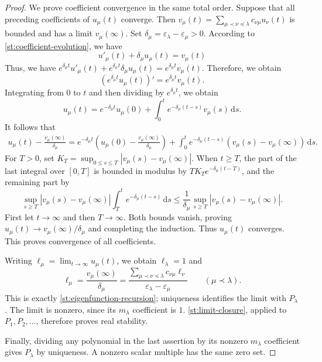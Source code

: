 \documentclass[10pt,a4paper]{amsart}
\begin{document}
\begin{proof}
We prove coefficient convergence in the same total order.  Suppose that all preceding coefficients of $u_{\mu}(t)$ converge.  Then
$v_\mu(t)=\sum_{\mu\prec\nu\preceq\lambda}c_{\nu\mu}u_\nu(t)$
is bounded and has a limit $v_\mu(\infty)$.
Set $\delta_\mu=\varepsilon_\lambda-\varepsilon_\mu>0$.
According to \eqref{st:coefficient-evolution}, we have
$$u'_\mu(t) + \delta_\mu u_\mu(t) = v_\mu(t)$$
Thus, we have $e^{\delta_\mu t} u'_\mu(t) + e^{\delta_\mu t}\delta_\mu u_\mu(t) =e^{\delta_\mu t} v_\mu(t)$.
Therefore, we obtain
$$(e^{\delta_\mu t} u_\mu(t))'=e^{\delta_\mu t} v_\mu(t).$$
Integrating from $0$ to $t$ and then dividing by $e^{\delta_\mu t}$, we obtain 
\begin{equation}\label{st:variation-of-constants}
u_\mu(t)=e^{-\delta_\mu t}u_\mu(0)
 +\int_0^t e^{-\delta_\mu(t-s)}v_\mu(s)\,\mathrm ds.
\end{equation}
It follows that
\begin{align*}
u_\mu(t)-\frac{v_\mu(\infty)}{\delta_\mu}=e^{-\delta_\mu t}\left(u_\mu(0)-\frac{v_\mu(\infty)}{\delta_\mu}\right)+\int_0^t e^{-\delta_\mu(t-s)}(v_\mu(s)-v_\mu(\infty))\,\mathrm ds.
\end{align*}
For $T>0$, set
$K_T=\sup_{0\leq s\leq T}|v_\mu(s)-v_\mu(\infty)|$.
When $t\geq T$, the part of the last integral over $[0,T]$ is
bounded in modulus by $TK_Te^{-\delta_\mu(t-T)}$, and the
remaining part by
\[
\sup_{s\geq T}|v_\mu(s)-v_\mu(\infty)|
 \int_T^t e^{-\delta_\mu(t-s)}\,\mathrm ds
\leq\frac1{\delta_\mu}
 \sup_{s\geq T}|v_\mu(s)-v_\mu(\infty)|.
\]
First let $t\to\infty$ and then $T\to\infty$.
Both bounds vanish, proving
$u_\mu(t)\to v_\mu(\infty)/\delta_\mu$ and completing the induction.
Thus $u_\mu(t)$ converges. This proves convergence of all coefficients.

Writing $\ell_\mu=\lim_{t\to\infty}u_\mu(t)$, we obtain
$\ell_\lambda=1$ and
\begin{equation}\label{st:limit-recursion}
\ell_\mu
=\frac{v_\mu(\infty)}{\delta_\mu}
=\frac{\displaystyle\sum_{\mu\prec\nu\preceq\lambda}
                 c_{\nu\mu}\ell_\nu}
       {\varepsilon_\lambda-\varepsilon_\mu}
\qquad(\mu\prec\lambda).
\end{equation}
This is exactly \eqref{st:eigenfunction-recursion}; uniqueness
identifies the limit with $P_\lambda$.  The limit is nonzero,
since its $m_\lambda$ coefficient is $1$. \cref{st:limit-closure}, applied to $P_1,P_2,\ldots$,
therefore proves real stability.

Finally, dividing any polynomial in the last assertion by its
nonzero $m_\lambda$ coefficient gives $P_\lambda$ by uniqueness.
A nonzero scalar multiple has the same zero set.
\end{proof}
\end{document}
